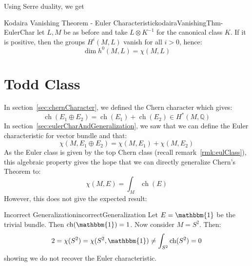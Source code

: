 \documentclass{ut-thesis}
\newenvironment{Proof}[1][]
  {\begin{ProofTcb}[#1]}
  {\end{ProofTcb}}
\newcommand{\Q}{{\mathbb{Q}}}
\newcommand{\ch}{{\operatorname{ch}}}
\renewcommand{\ch}{{\operatorname{ch}}}
\begin{document}
\begin{Proof}
\cite{deligneRelevementsModulop2etDecomposition1987}
\end{Proof}

Using Serre duality, we get

\begin{thm}{Kodaira Vanishing Theorem - Euler Characteristic}{kodairaVanishingThm-EulerChar}
  let $L,M$ be as before and take $L\otimes K^{-1}$ for the canonical class $K$. If it is positive, then the
  groups $H^i(M, L)$ vanish for all $i > 0$, hence:
  \[
    \dim h^0(M, L) = \chi(M, L)
  \]
\end{thm}

\begin{Proof}
  \cite{deligneRelevementsModulop2etDecomposition1987}
\end{Proof}



















\chapter{Todd Class}\label{cha:toddGenus}

In section~\ref{sec:chernCharacter}, we defined the Chern character which gives:
\[
  \ch(E_1\oplus E_2) = \ch(E_1) + \ch(E_2) \in H^*(M, \Q)
\]
In section~\ref{sec:eulerCharAndGeneralization}, we saw that we can define the Euler characteristic for vector
bundle and that:
\[
  \chi(M, E_1\oplus E_2) = \chi(M, E_1) + \chi(M, E_2)
\]
As the Euler class is given by the top Chern class (recall remark~\ref{rmk:eulClass}), this algebraic property gives the hope that we can directly generalize Chern's Theorem to:
\[
  \chi(M, E) = \int_M \ch(E)
\]
However, this does not give the expected result:

\begin{example}{Incorrect Generalization}{incorrectGeneralization}
  Let $E = \mathbbm{1}$ be the trivial bundle. Then $\ch(\mathbbm{1}) = 1$. Now consider $M= S^2$. Then:
  \[
    2 = \chi({S^2}) = \chi({S^2}, \mathbbm{1}) \ne \int_{S^2} \ch(S^2) = 0
  \]
  showing we do not recover the Euler characteristic.
\end{example}
\end{document}
